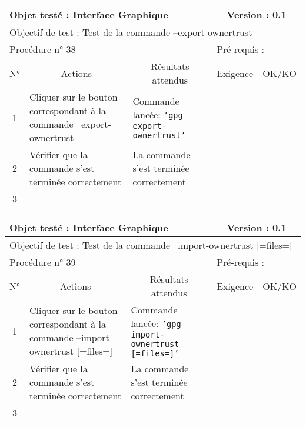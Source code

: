\documentclass{../res/univ-projet}
\begin{document}
\begin{center}
\begin{tabular}{|c|p{5cm}|p{5cm}|p{1.5cm}|p{1.5cm}|}
\hline
\multicolumn{3}{|l|}{Objet testé : Interface Graphique} & \multicolumn{2}{c|}{Version : 0.1}\\ \hline
\multicolumn{5}{|l|}{Objectif de test : Test de la commande –export-ownertrust}\\ \hline
\multicolumn{3}{|l|}{Procédure n° 38} & \multicolumn{2}{p{3cm}|}{Pré-requis : }\\ \hline
\multicolumn{1}{|c|}{N°} & \multicolumn{1}{c|}{Actions} & \multicolumn{1}{c|}{Résultats attendus} & 
\multicolumn{1}{c|}{Exigence} & \multicolumn{1}{c|}{OK/KO}\\ \hline
1 & Cliquer sur le bouton correspondant à la commande –export-ownertrust & Commande lancée: \texttt{'gpg –export-ownertrust'} &  & \\
2 & Vérifier que la commande s'est terminée correctement & La commande s'est terminée correctement &  & \\
3 &  &  &  & \\ \hline
\end{tabular}
\vskip 2.2cm


\begin{tabular}{|c|p{5cm}|p{5cm}|p{1.5cm}|p{1.5cm}|}
\hline
\multicolumn{3}{|l|}{Objet testé : Interface Graphique} & \multicolumn{2}{c|}{Version : 0.1}\\ \hline
\multicolumn{5}{|l|}{Objectif de test : Test de la commande –import-ownertrust [=files=]}\\ \hline
\multicolumn{3}{|l|}{Procédure n° 39} & \multicolumn{2}{p{3cm}|}{Pré-requis : }\\ \hline
\multicolumn{1}{|c|}{N°} & \multicolumn{1}{c|}{Actions} & \multicolumn{1}{c|}{Résultats attendus} & 
\multicolumn{1}{c|}{Exigence} & \multicolumn{1}{c|}{OK/KO}\\ \hline
1 & Cliquer sur le bouton correspondant à la commande –import-ownertrust [=files=] & Commande lancée: \texttt{'gpg –import-ownertrust [=files=]'} &  & \\
2 & Vérifier que la commande s'est terminée correctement & La commande s'est terminée correctement &  & \\
3 &  &  &  & \\ \hline
\end{tabular}
\vskip 2.2cm



\end{center}
\end{document}
